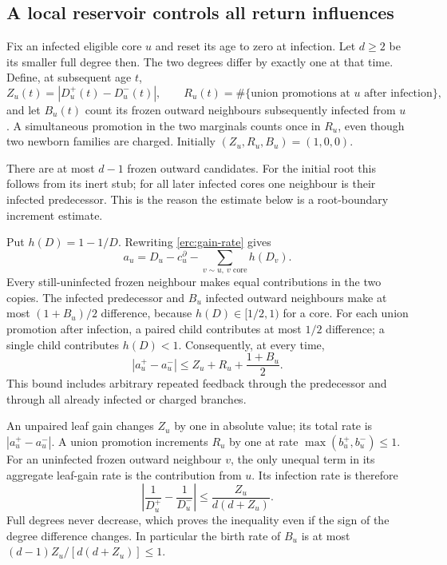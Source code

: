 \subsection{A local reservoir controls all return influences}

Fix an infected eligible core $u$ and reset its age to zero at infection.
Let $d\ge2$ be its smaller full degree then.  The two degrees differ
by exactly one at that time.  Define, at subsequent age $t$,
\[
 Z_u(t)=|D_u^+(t)-D_u^-(t)|,\qquad
 R_u(t)=\#\{\text{union promotions at }u\text{ after infection}\},
\]
and let $B_u(t)$ count its frozen outward neighbours subsequently
infected from $u$.  A simultaneous promotion in the two marginals
counts once in $R_u$, even though two newborn families are charged.
Initially $(Z_u,R_u,B_u)=(1,0,0)$.

There are at most $d-1$ frozen outward candidates.  For the initial
root this follows from its inert stub; for all later infected cores
one neighbour is their infected predecessor.  This is the reason the
estimate below is a root-boundary increment estimate.

Put $h(D)=1-1/D$.  Rewriting \eqref{erc:gain-rate} gives
\[
 a_u=D_u-c_u^\partial-
       \sum_{v\sim u,\ v\text{ core}} h(D_v).
\]
Every still-uninfected frozen neighbour makes equal contributions in
the two copies.  The infected predecessor and $B_u$ infected outward
neighbours make at most $(1+B_u)/2$ difference, because
$h(D)\in[1/2,1)$ for a core.  For each union promotion after infection,
a paired child contributes at most $1/2$ difference; a single child
contributes $h(D)<1$.  Consequently, at every time,
\begin{equation}\label{erc:local-discrepancy}
 |a_u^+-a_u^-|
 \le Z_u+R_u+\frac{1+B_u}{2}.
\end{equation}
This bound includes arbitrary repeated feedback through the predecessor
and through all already infected or charged branches.

An unpaired leaf gain changes $Z_u$ by one in absolute value; its total
rate is $|a_u^+-a_u^-|$.  A union promotion increments $R_u$ by one
at rate $\max(b_u^+,b_u^-)\le1$.  For an uninfected frozen outward
neighbour $v$, the only unequal term in its aggregate leaf-gain rate
is the contribution from $u$.  Its infection rate is therefore
\begin{equation}\label{erc:edge-rate}
 \left|\frac1{D_u^+}-\frac1{D_u^-}\right|
 \le \frac{Z_u}{d(d+Z_u)}.
\end{equation}
Full degrees never decrease, which proves the inequality even if the
sign of the degree difference changes.  In particular the birth rate
of $B_u$ is at most $(d-1)Z_u/[d(d+Z_u)]\le1$.


